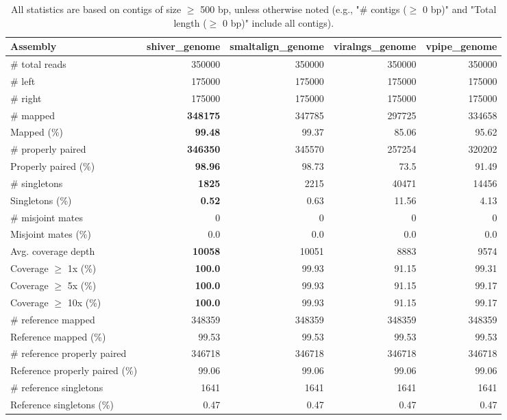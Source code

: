 \documentclass[12pt,a4paper]{article}
\begin{document}
\begin{table}[ht]
\begin{center}
\caption{All statistics are based on contigs of size $\geq$ 500 bp, unless otherwise noted (e.g., "\# contigs ($\geq$ 0 bp)" and "Total length ($\geq$ 0 bp)" include all contigs).}
\begin{tabular}{|l*{4}{|r}|}
\hline
Assembly & shiver\_genome & smaltalign\_genome & viralngs\_genome & vpipe\_genome \\ \hline
\# total reads & 350000 & 350000 & 350000 & 350000 \\ \hline
\# left & 175000 & 175000 & 175000 & 175000 \\ \hline
\# right & 175000 & 175000 & 175000 & 175000 \\ \hline
\# mapped & {\bf 348175} & 347785 & 297725 & 334658 \\ \hline
Mapped (\%) & {\bf 99.48} & 99.37 & 85.06 & 95.62 \\ \hline
\# properly paired & {\bf 346350} & 345570 & 257254 & 320202 \\ \hline
Properly paired (\%) & {\bf 98.96} & 98.73 & 73.5 & 91.49 \\ \hline
\# singletons & {\bf 1825} & 2215 & 40471 & 14456 \\ \hline
Singletons (\%) & {\bf 0.52} & 0.63 & 11.56 & 4.13 \\ \hline
\# misjoint mates & 0 & 0 & 0 & 0 \\ \hline
Misjoint mates (\%) & 0.0 & 0.0 & 0.0 & 0.0 \\ \hline
Avg. coverage depth & {\bf 10058} & 10051 & 8883 & 9574 \\ \hline
Coverage $\geq$ 1x (\%) & {\bf 100.0} & 99.93 & 91.15 & 99.31 \\ \hline
Coverage $\geq$ 5x (\%) & {\bf 100.0} & 99.93 & 91.15 & 99.17 \\ \hline
Coverage $\geq$ 10x (\%) & {\bf 100.0} & 99.93 & 91.15 & 99.17 \\ \hline
\# reference mapped & 348359 & 348359 & 348359 & 348359 \\ \hline
Reference mapped (\%) & 99.53 & 99.53 & 99.53 & 99.53 \\ \hline
\# reference properly paired & 346718 & 346718 & 346718 & 346718 \\ \hline
Reference properly paired (\%) & 99.06 & 99.06 & 99.06 & 99.06 \\ \hline
\# reference singletons & 1641 & 1641 & 1641 & 1641 \\ \hline
Reference singletons (\%) & 0.47 & 0.47 & 0.47 & 0.47 \\ \hline

\end{tabular}
\end{center}
\end{table}
\end{document}
